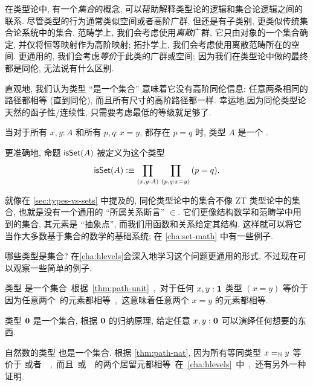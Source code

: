 %

在类型论中, 有一个\emph{集合}的概念, 可以帮助解释类型论的逻辑和集合论逻辑之间的联系.
尽管类型的行为通常类似空间或者高阶广群, 但还是有子类别, 更类似传统集合论系统中的集合.
范畴学上, 我们会考虑使用\emph{离散}广群, 它只由对象的一个集合确定, 并仅将恒等映射作为高阶映射;
拓扑学上, 我们会考虑使用离散范畴所在的空间.
更通用的, 我们会考虑\emph{等价}于此类的广群或空间; 因为我们在类型论中做的最终都是同伦, 无法说有什么区别.

直观地, 我们认为类型 ``是一个集合'' 意味着它没有高阶同伦信息: 任意两条相同的路径都相等 (直到同伦), 而且所有尺寸的高阶路径都一样.
幸运地,因为同伦类型论天然的函子性/连续性,
%
%
只需要考虑最低的等级就足够了.

\begin{defn}
    \label{defn:set}
    当对于所有 $x,y:A$ 和所有 $p,q:x=y$, 都存在 $p=q$ 时,
    类型 $A$ 是一个 .
\end{defn}

更准确地, 命题 $\isset(A)$ 被定义为这个类型
\[ \isset(A) \defeq \prd{x,y:A}{p,q:x=y} (p=q). \]

就像在 \cref{sec:types-vs-sets} 中提及的,
同伦类型论中的集合不像 ZT 类型论中的集合, 也就是没有一个通用的 ``所属关系断言'' $\in$.
它们更像结构数学和范畴学中用到的集合, 其元素是 ``抽象点'', 而我们用函数和关系给定其结构.
这样就可以将它当作大多数基于集合的数学的基础系统;
在 \cref{cha:set-math} 中有一些例子.

哪些类型是集合?
在\cref{cha:hlevels}会深入地学习这个问题更通用的形式, 不过现在可以观察一些简单的例子.

\begin{eg}
    \label{eg:isset-unit}
    类型 \unit 是一个集合.
    根据\cref{thm:path-unit}, 对于任何 $x,y:\unit$ 类型 $(x=y)$ 等价于 \unit.
    因为任意两个 \unit 的元素都相等, 这意味着任意两个 $x=y$ 的元素都相等.
\end{eg}

\begin{eg}
    \label{eg:isset-empty}
    类型 $\emptyt$ 是一个集合, 根据 $\emptyt$ 的归纳原理, 给定任意 $x,y:\emptyt$ 可以演绎任何想要的东西.
\end{eg}

\begin{eg}
    \label{thm:nat-set}
    自然数的类型 \nat 也是一个集合.
    根据 \cref{thm:path-nat}, 因为所有等同类型 $\id[\nat]xy$ 等价于 \unit 或者 \emptyt, 而且 \unit 或 \emptyt 的两个居留元都相等.
    在 \cref{cha:hlevels} 中, 还有另外一种证明.
\end{eg}

